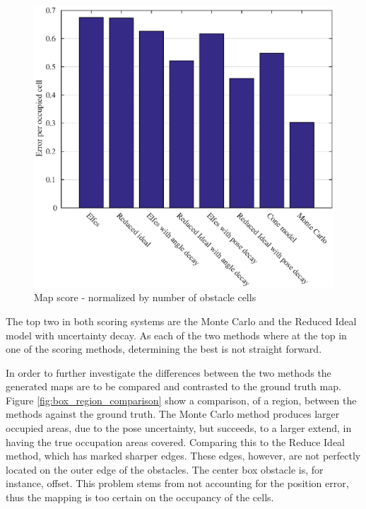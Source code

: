 \begin{figure}[htbp]
	\centering
	\includegraphics[scale=1]{figures/static_mapping/comparison_obstacle_error_per_cell}
	\caption{Map score - normalized by number of obstacle cells}
	\label{fig:comparison_obstacle_error_per_cell}
\end{figure}

The top two in both scoring systems are the Monte Carlo and the Reduced Ideal model with uncertainty decay. As each of the two methods where at the top in one of the scoring methods, determining the best is not straight forward.

In order to further investigate the differences between the two methods the generated maps are to be compared and contrasted to the ground truth map. 
Figure \vref{fig:box_region_comparison} show a comparison, of a region, between the methods against the ground truth.
The Monte Carlo method produces larger occupied areas, due to the pose uncertainty, but succeeds, to a larger extend, in having the true occupation areas covered. 
Comparing this to the Reduce Ideal method, which has marked sharper edges. 
These edges, however, are not perfectly located on the outer edge of the obstacles. 
The center box obstacle is, for instance, offset. 
This problem stems from not accounting for the position error, thus the mapping is too certain on the occupancy of the cells. 

